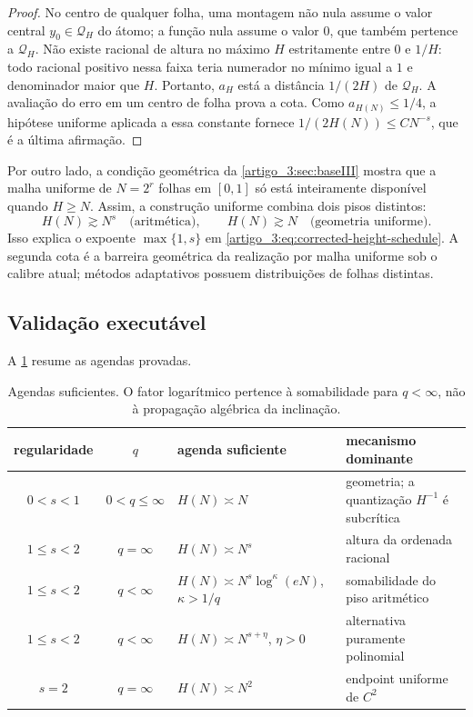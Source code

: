 \documentclass[12pt,a4paper]{article}
\theoremstyle{preciso}
\theoremstyle{definition}
\theoremstyle{preciso}
\theoremstyle{preciso}
\theoremstyle{preciso}
\theoremstyle{preciso}
\theoremstyle{definition}
\theoremstyle{preciso}
\theoremstyle{definition}
\theoremstyle{preciso}
\theoremstyle{preciso}
\theoremstyle{definition}
\begin{document}
\begin{proof}
No centro de qualquer folha, uma montagem não nula assume o valor central
$y_0\in\mathcal Q_H$ do átomo; a função nula assume o valor $0$, que também
pertence a $\mathcal Q_H$. Não existe racional de altura no máximo $H$
estritamente entre $0$ e $1/H$: todo racional positivo nessa faixa teria
numerador no mínimo igual a $1$ e denominador maior que $H$. Portanto,
$a_H$ está a distância $1/(2H)$ de $\mathcal Q_H$. A avaliação do erro em um
centro de folha prova a cota. Como $a_{H(N)}\le1/4$, a hipótese uniforme
aplicada a essa constante fornece
$1/(2H(N))\le CN^{-s}$, que é a última afirmação.
\end{proof}

Por outro lado, a condição geométrica da \cref{artigo_3:sec:baseIII} mostra que a malha
uniforme de $N=2^r$ folhas em $[0,1]$ só está inteiramente disponível quando
$H\ge N$. Assim, a construção uniforme combina dois pisos distintos:
\begin{equation}
 H(N)\gtrsim N^s\quad\text{(aritmética)},
 \qquad
 H(N)\gtrsim N\quad\text{(geometria uniforme)}.
 \label{artigo_3:eq:two-height-floors}
\end{equation}
Isso explica o expoente $\max\{1,s\}$ em
\eqref{artigo_3:eq:corrected-height-schedule}. A segunda cota é a barreira geométrica
da realização por malha uniforme sob o calibre atual; métodos adaptativos
possuem distribuições de folhas distintas.

\subsection{Validação executável}

A \cref{artigo_3:tab:height-schedules} resume as agendas provadas.
\begin{table}[t]
 \centering
\caption{Agendas suficientes. O fator logarítmico pertence à
 somabilidade para $q<\infty$, não à propagação algébrica da inclinação.}\label{artigo_3:tab:height-schedules}
\small
 \begin{tabularx}{\linewidth}{@{}cclX@{}}
\toprule
regularidade & $q$ & agenda suficiente & mecanismo dominante\\
\midrule
$0<s<1$ & $0<q\le\infty$ & $H(N)\asymp N$ & geometria; a quantização $H^{-1}$ é subcrítica\\
$1\le s<2$ & $q=\infty$ & $H(N)\asymp N^s$ & altura da ordenada racional\\
$1\le s<2$ & $q<\infty$ & $H(N)\asymp N^s\log^\kappa(eN)$, $\kappa>1/q$ & somabilidade do piso aritmético\\
$1\le s<2$ & $q<\infty$ & $H(N)\asymp N^{s+\eta}$, $\eta>0$ & alternativa puramente polinomial\\
$s=2$ & $q=\infty$ & $H(N)\asymp N^2$ & endpoint uniforme de $C^2$\\
\bottomrule
\end{tabularx}
\end{table}
\end{document}
